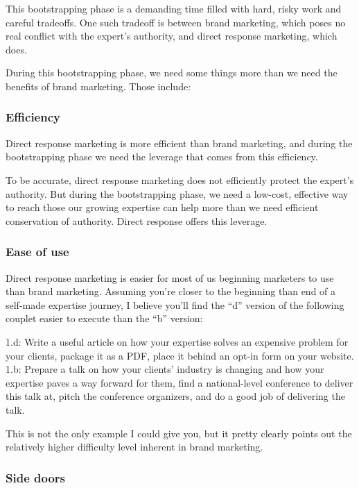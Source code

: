 \documentclass[13pt,]{tufte-handout}
\begin{document}
This bootstrapping phase is a demanding time filled with hard, risky
work and careful tradeoffs. One such tradeoff is between brand
marketing, which poses no real conflict with the expert's authority, and
direct response marketing, which does.

During this bootstrapping phase, we need some things more than we need
the benefits of brand marketing. Those include:

\hypertarget{efficiency}{%
\subsubsection{Efficiency}\label{efficiency}}

Direct response marketing is more efficient than brand marketing, and
during the bootstrapping phase we need the leverage that comes from this
efficiency.

To be accurate, direct response marketing does not efficiently protect
the expert's authority. But during the bootstrapping phase, we need a
low-cost, effective way to reach those our growing expertise can help
more than we need efficient conservation of authority. Direct response
offers this leverage.

\hypertarget{ease-of-use}{%
\subsubsection{Ease of use}\label{ease-of-use}}

Direct response marketing is easier for most of us beginning marketers
to use than brand marketing. Assuming you're closer to the beginning
than end of a self-made expertise journey, I believe you'll find the
``d'' version of the following couplet easier to execute than the ``b''
version:

1.d: Write a useful article on how your expertise solves an expensive
problem for your clients, package it as a PDF, place it behind an opt-in
form on your website. 1.b: Prepare a talk on how your clients' industry
is changing and how your expertise paves a way forward for them, find a
national-level conference to deliver this talk at, pitch the conference
organizers, and do a good job of delivering the talk.

This is not the only example I could give you, but it pretty clearly
points out the relatively higher difficulty level inherent in brand
marketing.

\hypertarget{side-doors}{%
\subsubsection{Side doors}\label{side-doors}}
\end{document}
